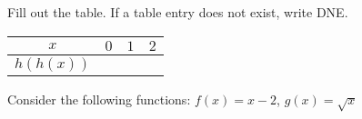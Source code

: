 \documentclass[11pt,answers]{exam}
\begin{document}
\begin{questions}
\begin{minipage}{0.5\linewidth}
\begin{center}
\begin{mfpic}[20]{-1}{3}{-1}{5}
		
			
			
			\axes
			
			
			
			\tlpointsep{4pt}
			
			
			
			
		\end{mfpic}
	\end{center}
\end{minipage}
\begin{minipage}{0.5\linewidth}
	Fill out the table. If a table entry does not exist, write DNE.
	\smallskip
	
	\centering
	\begin{tabularx}{0.8\textwidth}{|X|X|X|X|X|}
		\hline
		\multicolumn{2}{|c|}{$x$}         &$0$&$1$& $2$  \\ \hline
		\multicolumn{2}{|c|}{$h(h(x))$}   &   &   &      \\ \hline
	\end{tabularx}
\end{minipage}
\question Consider the following functions:
$\displaystyle f(x) = x-2$,     $\displaystyle g(x) = \sqrt{x}$ 
\end{questions}
\end{document}
